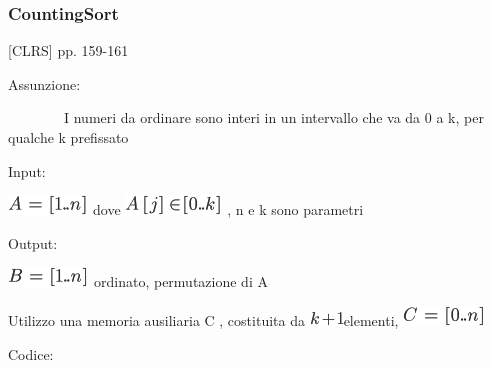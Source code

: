 \documentclass{article}
\begin{document}
{\hypertarget{h.bfk18jaq5ar4}{\subsubsection{\texorpdfstring{{CountingSort}}{CountingSort}}\label{h.bfk18jaq5ar4}}

{{[}CLRS{]} pp. 159-161}

{Assunzione:}

{~~~~~~~~I numeri da ordinare sono interi in un intervallo che va da 0 a
k, per qualche k prefissato}

{Input:}

\includegraphics{images/image182.png}{~dove
}\includegraphics{images/image183.png}{~, n e k sono parametri}

{Output:}

\includegraphics{images/image184.png}{~}{ordinato}{,
permutazione di A}

{Utilizzo una memoria ausiliaria C , costituita da
}\includegraphics{images/image185.png}{elementi,
}\includegraphics{images/image186.png}

{Codice:}



\protect\hypertarget{t.838fe42014bbeb1605fc7de3c1957472acce8e3d}{}{}\protect\hypertarget{t.27}{}{}

}
\end{document}
